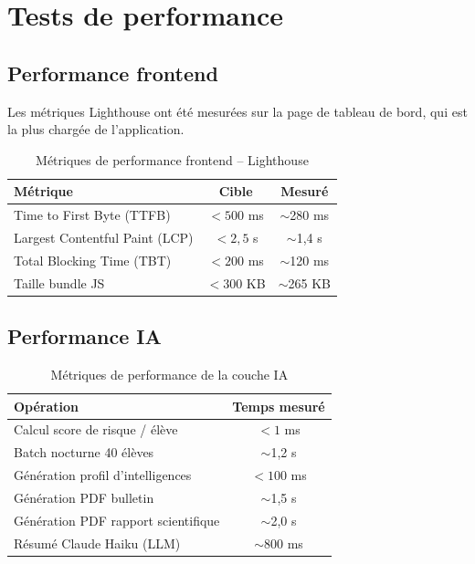 \documentclass[12pt,a4paper,oneside]{report}
\begin{document}
\section{Tests de performance}

\subsection{Performance frontend}

Les métriques Lighthouse ont été mesurées sur la page de tableau de bord, qui est la plus chargée de l'application.

\begin{table}[H]
\centering
\caption{Métriques de performance frontend -- Lighthouse}
\label{tab:perf}
\begin{tabular}{lcc}
\toprule
\textbf{Métrique} & \textbf{Cible} & \textbf{Mesuré} \\
\midrule
Time to First Byte (TTFB) & $< 500$ ms & $\sim$280 ms \\
Largest Contentful Paint (LCP) & $< 2{,}5$ s & $\sim$1,4 s \\
Total Blocking Time (TBT) & $< 200$ ms & $\sim$120 ms \\
Taille bundle JS & $< 300$ KB & $\sim$265 KB \\
\bottomrule
\end{tabular}
\end{table}

\subsection{Performance IA}

\begin{table}[H]
\centering
\caption{Métriques de performance de la couche IA}
\label{tab:perf_ia}
\begin{tabular}{lc}
\toprule
\textbf{Opération} & \textbf{Temps mesuré} \\
\midrule
Calcul score de risque / élève & $< 1$ ms \\
Batch nocturne 40 élèves & $\sim$1,2 s \\
Génération profil d'intelligences & $< 100$ ms \\
Génération PDF bulletin & $\sim$1,5 s \\
Génération PDF rapport scientifique & $\sim$2,0 s \\
Résumé Claude Haiku (LLM) & $\sim$800 ms \\
\bottomrule
\end{tabular}
\end{table}
\end{document}
